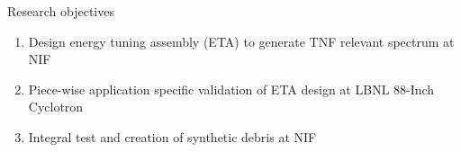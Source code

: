 \documentclass[xcolor=x11names,compress,handout]{beamer}
\renewcommand{\(}{\begin{columns}}
\renewcommand{\)}{\end{columns}}
\newcommand{\<}[1]{\begin{column}{#1}}
\renewcommand{\>}{\end{column}}
\begin{document}
\begin{frame}{Research objectives}
    \vspace{0.3cm}
    \begin{enumerate}
      \item Design energy tuning assembly (ETA) to generate TNF relevant spectrum at NIF
      \item Piece-wise application specific validation of ETA design at LBNL 88-Inch Cyclotron
      \item Integral test and creation of synthetic debris at NIF
    \end{enumerate}
  \vspace*{-1.5em}
  \renewcommand*{\thesubfigure}{}
  \begin{figure}[htp]
    \centering
    \subcapcentertrue
    \vspace{0.3cm}
    \hspace{0.0cm}
  \end{figure}
\end{frame}
\end{document}

